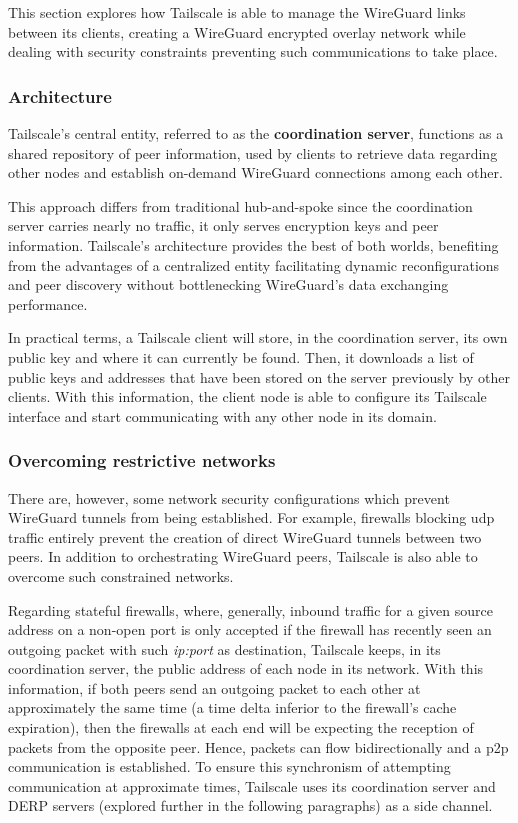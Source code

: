 \documentclass[11pt,twoside,a4paper]{report}
\begin{document}
This section explores how Tailscale is able to manage the WireGuard links between its clients, creating a WireGuard encrypted overlay network while dealing with security constraints preventing such communications to take place.

\subsubsection{Architecture}

Tailscale's central entity, referred to as the \textbf{coordination server}, functions as a shared repository of peer information, used by clients to retrieve data regarding other nodes and establish on-demand WireGuard connections among each other.

This approach differs from traditional hub-and-spoke since the coordination server carries nearly no traffic, it only serves encryption keys and peer information. Tailscale's architecture provides the best of both worlds, benefiting from the advantages of a centralized entity facilitating dynamic reconfigurations and peer discovery without bottlenecking WireGuard's data exchanging performance.

In practical terms, a Tailscale client will store, in the coordination server, its own public key and where it can currently be found. Then, it downloads a list of public keys and addresses that have been stored on the server previously by other clients. With this information, the client node is able to configure its Tailscale interface and start communicating with any other node in its domain.

\subsubsection{Overcoming restrictive networks}
\label{ssec:tsnetworks}

There are, however, some network security configurations which prevent WireGuard tunnels from being established. For example, firewalls blocking \ac{udp} traffic entirely prevent the creation of direct WireGuard tunnels between two peers. In addition to orchestrating WireGuard peers, Tailscale is also able to overcome such constrained networks.

Regarding stateful firewalls, where, generally, inbound traffic for a given source address on a non-open port is only accepted if the firewall has recently seen an outgoing packet with such \emph{ip:port} as destination, Tailscale keeps, in its coordination server, the public address of each node in its network. With this information, if both peers send an outgoing packet to each other at approximately the same time (a time delta inferior to the firewall's cache expiration), then the firewalls at each end will be expecting the reception of packets from the opposite peer. Hence, packets can flow bidirectionally and a \ac{p2p} communication is established. To ensure this synchronism of attempting communication at approximate times, Tailscale uses its coordination server and \ac{DERP} servers (explored further in the following paragraphs) as a side channel.
\end{document}
